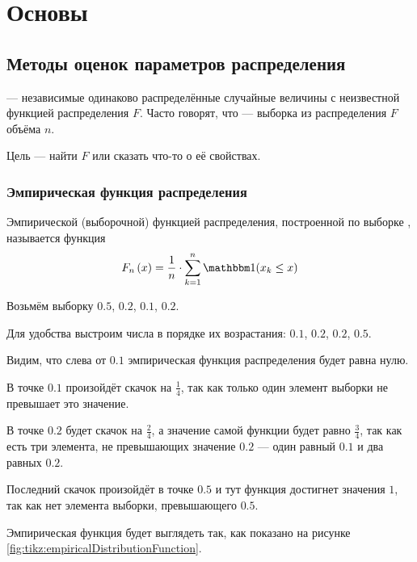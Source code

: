 \chapter{Основы}
\section{Методы оценок параметров распределения}
\xsample --- независимые одинаково распределённые случайные величины
с неизвестной функцией распределения $F$.
Часто говорят, что \xsample --- выборка из распределения $F$
объёма $n$.

Цель --- найти $F$ или сказать что-то о её свойствах.

\subsection{Эмпирическая функция распределения}
\begin{definition}
  Эмпирической (выборочной) функцией распределения,
  построенной по выборке \xsample, называется функция
  $$\cdfn{x}= \frac{1}{n}\cdot \sum_{k=1}^n
  \indicator{x_k\le x}$$
\end{definition}

\begin{example}
  \label{ex:empiricalDistributionFunction}
  Возьмём выборку $0.5$, $0.2$, $0.1$, $0.2$.

  Для удобства выстроим числа в порядке их возрастания:
  $0.1$, $0.2$, $0.2$, $0.5$.

  Видим, что слева от $0.1$ эмпирическая функция распределения будет равна
  нулю.

  В точке $0.1$ произойдёт скачок на $\frac{1}{4}$, так как только один
  элемент выборки не превышает это значение.

  В точке $0.2$ будет скачок на $\frac{2}{4}$, а значение самой функции
  будет равно $\frac{3}{4}$, так как есть три элемента, не превышающих
  значение $0.2$ --- один равный $0.1$ и два равных $0.2$.

  Последний скачок произойдёт в точке $0.5$ и тут функция достигнет
  значения $1$, так как нет элемента выборки, превышающего
  $0.5$.

  Эмпирическая функция будет выглядеть так, как показано на
  рисунке \ref{fig:tikz:empiricalDistributionFunction}.
\end{example}

